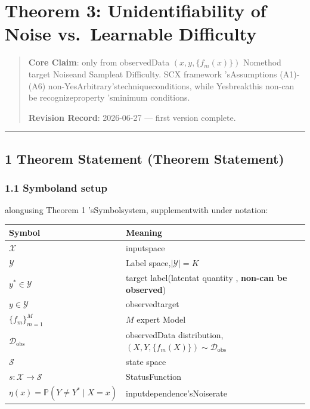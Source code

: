 \documentclass[
  12pt,
]{article}
\author{SCX}
\date{2026}
\begin{document}
\section{Theorem 3: Unidentifiability of Noise vs.~Learnable
Difficulty}\label{theorem-3-unidentifiability-of-noise-vs.-learnable-difficulty}

\begin{quote}
\textbf{Core Claim}: only from observedData \((x, y, \{f_m(x)\})\)
Nomethod target Noiseand Sampleat Difficulty. SCX framework 'sAssumptions (A1)-(A6)
non-YesArbitrary'stechniqueconditions, while Yesbreakthis non-can be recognizeproperty 'sminimum conditions. 

\textbf{Revision Record}: 2026-06-27 --- first version complete. 
\end{quote}

\begin{center}\rule{0.5\linewidth}{0.5pt}\end{center}

\subsection{1 Theorem Statement (Theorem
Statement)}\label{ux5b9aux7406ux9648ux8ff0-theorem-statement}

\subsubsection{1.1 Symboland setup}\label{ux7b26ux53f7ux4e0eux8bbeux5b9a}

alongusing  Theorem 1 'sSymbolsystem, supplementwith under notation: 

\begin{longtable}[]{@{}
  >{\raggedright\arraybackslash}p{}
  >{\raggedright\arraybackslash}p{}@{}}
\toprule\noalign{}
\begin{minipage}[b]{\linewidth}\raggedright
Symbol
\end{minipage} & \begin{minipage}[b]{\linewidth}\raggedright
Meaning
\end{minipage} \\
\midrule\noalign{}
\endhead
\bottomrule\noalign{}
\endlastfoot
\(\mathcal{X}\) & inputspace  \\
\(\mathcal{Y}\) & Label space,\(|\mathcal{Y}| = K\) \\
\(y^* \in \mathcal{Y}\) & target label(latentat quantity , \textbf{non-can be observed}) \\
\(y \in \mathcal{Y}\) & observedtarget  \\
\(\{f_m\}_{m=1}^M\) & \(M\) expert Model \\
\(\mathcal{D}_{\text{obs}}\) &
observedData distribution,\((X, Y, \{f_m(X)\}) \sim \mathcal{D}_{\text{obs}}\) \\
\(\mathcal{S}\) & state space \\
\(s: \mathcal{X} \to \mathcal{S}\) & StatusFunction \\
\(\eta(x) = \mathbb{P}(Y \neq Y^* \mid X = x)\) & inputdependence'sNoiserate  \\
\end{longtable}
\end{document}
